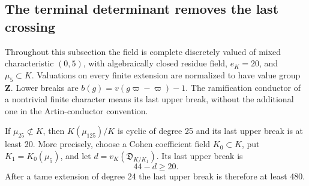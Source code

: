 \subsection{The terminal determinant removes the last crossing}

Throughout this subsection the field is complete discretely valued
of mixed characteristic \((0,5)\), with algebraically closed residue
field, \(e_K=20\), and \(\mu _5\subset K\). Valuations on every
finite extension are normalized to have value group \(\mathbf Z\).
Lower breaks are \(b(g)=v(g\varpi-\varpi)-1\). The ramification
conductor of a nontrivial finite character means its last upper
break, without the additional one in the Artin-conductor convention.

\begin{lemma}
\label{lem:B-RD93-cyclotomic}
If \(\mu _{25}\not\subset K\), then
\(K(\mu _{125})/K\) is cyclic of degree 25 and its last upper
break is at least 20. More precisely, choose a Cohen coefficient
field \(K_0\subset K\), put \(K_1=K_0(\mu _5)\), and let
\(d=v_K(\mathfrak D_{K/K_1})\). Its last upper break is
\[
                              44-d\ge20.              \tag{B-RD93.1}
\]
After a tame extension of degree 24 the last upper break is
therefore at least 480.
\end{lemma}
